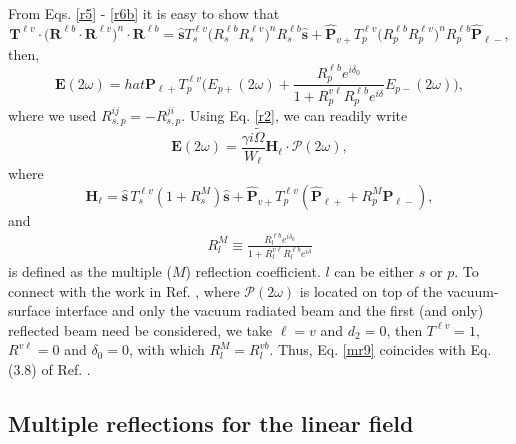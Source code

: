 From Eqs. \eqref{r5} - \eqref{r6b} it is easy to show that
\begin{equation*}\label{m1}
\mathbf{T}^{\ell v}\cdot
\Big(\mathbf{R}^{\ell b}\cdot\mathbf{R}^{\ell v}\Big)^{n}\cdot
\mathbf{R}^{\ell b}
= \hat{\mathbf{s}}T^{\ell v}_{s}
  \Big(R^{\ell b}_{s}R^{\ell v}_{s}\Big)^{n}R^{\ell b}_{s}\hat{\mathbf{s}}
+ \hat{\mathbf{P}}_{v+}T^{\ell v}_{p}\Big(R^{\ell b}_{p}R^{\ell v}_{p}\Big)^n 
  R^{\ell b}_{p} 
\hat{\mathbf{P}}_{\ell-},
\end{equation*}
then,
\begin{equation}\label{eq:E2wreduced}
\mathbf{E}(2\omega) 
=  hat{\mathbf{P}}_{\ell +}T^{\ell v}_{p}
\Big(
E_{p+}(2\omega) +
\frac{R^{\ell b}_{p}e^{i\delta_{0}}}{1 + R^{v\ell}_{p}R^{\ell b}_{p}e^{i\delta}}
E_{p-}(2\omega) 
\Big),
\end{equation}
where we used $R^{ij}_{s,p}=-R^{ji}_{s,p}$. Using Eq. \eqref{r2}, we can readily
write
\begin{equation}\label{mr8}
\mathbf{E}(2\omega) =
\frac{\gamma i\tilde{\Omega}}{W_{\ell}}\mathbf{H}_{\ell}\cdot
\boldsymbol{\mathcal{P}}(2\omega),
\end{equation}
where
\begin{equation}\label{mr9}
\mathbf{H}_{\ell}
= \hat{\mathbf{s}}\,T_{s}^{\ell v}
\left(1+ R^{M}_{s}\right)\hat{\mathbf{s}} + \hat{\mathbf{P}}_{v+}T_{p}^{\ell v}
\left(\hat{\mathbf{P}}_{\ell +} + R^{M}_{p}\hat{\mathbf{P}}_{\ell -}\right),
\end{equation}
and
\begin{align}\label{m61}
R^{M}_{l}\equiv
\frac{R^{\ell b}_{l}e^{i\delta_{0}}}
     {1+R^{v\ell}_{l} R^{\ell b}_{l}e^{i\delta}}
\end{align}
is defined as the multiple ($M$) reflection coefficient. $l$ can be either $s$
or $p$. To connect with the work in Ref. \cite{mizrahiJOSA88}, where
$\boldsymbol{\mathcal{P}}(2\omega)$ is located on top of the vacuum-surface
interface and only the vacuum radiated beam and the first (and only) reflected
beam need be considered, we take $\ell = v$ and $d_{2} = 0$, then $T^{\ell v} =
1$, $R^{v\ell} = 0$ and $\delta_{0} = 0$, with which $R^{M}_{l}=R^{vb}_{l}$.
Thus, Eq. \eqref{mr9} coincides with Eq. (3.8) of Ref. \cite{mizrahiJOSA88}.



\subsection{Multiple reflections for the linear field}


